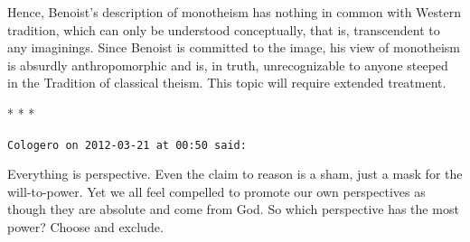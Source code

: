 Hence, Benoist's description of monotheism has nothing in common with Western tradition, which can only be understood conceptually, that is, transcendent to any imaginings. Since Benoist is committed to the image, his view of monotheism is absurdly anthropomorphic and is, in truth, unrecognizable to anyone steeped in the Tradition of classical theism. This topic will require extended treatment.



\begin{center}* * *\end{center}

\begin{footnotesize}
\begin{sffamily}

\texttt{Cologero on 2012-03-21 at 00:50 said:}

Everything is perspective. Even the claim to reason is a sham, just a mask for the will-to-power. Yet we all feel compelled to promote our own perspectives as though they are absolute and come from God. So which perspective has the most power? Choose and exclude.

\hfill

\end{sffamily}
\end{footnotesize}

